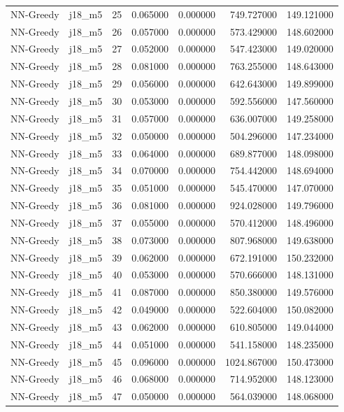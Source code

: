 \begin{tabular}{llrrrrr}
NN-Greedy & j18_m5 & 25 & 0.065000 & 0.000000 & 749.727000 & 149.121000 \\
NN-Greedy & j18_m5 & 26 & 0.057000 & 0.000000 & 573.429000 & 148.602000 \\
NN-Greedy & j18_m5 & 27 & 0.052000 & 0.000000 & 547.423000 & 149.020000 \\
NN-Greedy & j18_m5 & 28 & 0.081000 & 0.000000 & 763.255000 & 148.643000 \\
NN-Greedy & j18_m5 & 29 & 0.056000 & 0.000000 & 642.643000 & 149.899000 \\
NN-Greedy & j18_m5 & 30 & 0.053000 & 0.000000 & 592.556000 & 147.560000 \\
NN-Greedy & j18_m5 & 31 & 0.057000 & 0.000000 & 636.007000 & 149.258000 \\
NN-Greedy & j18_m5 & 32 & 0.050000 & 0.000000 & 504.296000 & 147.234000 \\
NN-Greedy & j18_m5 & 33 & 0.064000 & 0.000000 & 689.877000 & 148.098000 \\
NN-Greedy & j18_m5 & 34 & 0.070000 & 0.000000 & 754.442000 & 148.694000 \\
NN-Greedy & j18_m5 & 35 & 0.051000 & 0.000000 & 545.470000 & 147.070000 \\
NN-Greedy & j18_m5 & 36 & 0.081000 & 0.000000 & 924.028000 & 149.796000 \\
NN-Greedy & j18_m5 & 37 & 0.055000 & 0.000000 & 570.412000 & 148.496000 \\
NN-Greedy & j18_m5 & 38 & 0.073000 & 0.000000 & 807.968000 & 149.638000 \\
NN-Greedy & j18_m5 & 39 & 0.062000 & 0.000000 & 672.191000 & 150.232000 \\
NN-Greedy & j18_m5 & 40 & 0.053000 & 0.000000 & 570.666000 & 148.131000 \\
NN-Greedy & j18_m5 & 41 & 0.087000 & 0.000000 & 850.380000 & 149.576000 \\
NN-Greedy & j18_m5 & 42 & 0.049000 & 0.000000 & 522.604000 & 150.082000 \\
NN-Greedy & j18_m5 & 43 & 0.062000 & 0.000000 & 610.805000 & 149.044000 \\
NN-Greedy & j18_m5 & 44 & 0.051000 & 0.000000 & 541.158000 & 148.235000 \\
NN-Greedy & j18_m5 & 45 & 0.096000 & 0.000000 & 1024.867000 & 150.473000 \\
NN-Greedy & j18_m5 & 46 & 0.068000 & 0.000000 & 714.952000 & 148.123000 \\
NN-Greedy & j18_m5 & 47 & 0.050000 & 0.000000 & 564.039000 & 148.068000 \\

\end{tabular}
